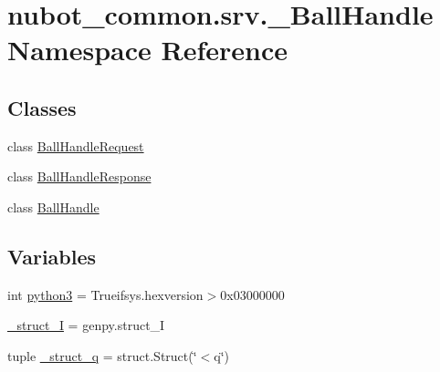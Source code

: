 \hypertarget{namespacenubot__common_1_1srv_1_1__BallHandle}{\section{nubot\-\_\-common.\-srv.\-\_\-\-Ball\-Handle Namespace Reference}
\label{namespacenubot__common_1_1srv_1_1__BallHandle}
}
\subsection*{Classes}
\begin{DoxyCompactItemize}
\item 
class \hyperlink{classnubot__common_1_1srv_1_1__BallHandle_1_1BallHandleRequest}{Ball\-Handle\-Request}
\item 
class \hyperlink{classnubot__common_1_1srv_1_1__BallHandle_1_1BallHandleResponse}{Ball\-Handle\-Response}
\item 
class \hyperlink{classnubot__common_1_1srv_1_1__BallHandle_1_1BallHandle}{Ball\-Handle}
\end{DoxyCompactItemize}
\subsection*{Variables}
\begin{DoxyCompactItemize}
\item 
int \hyperlink{namespacenubot__common_1_1srv_1_1__BallHandle_a5b43d243eb270a053a02014aebbe0b57}{python3} = Trueifsys.\-hexversion$>$0x03000000
\item 
\hyperlink{namespacenubot__common_1_1srv_1_1__BallHandle_ab2af3865598445d74f9f6f9dd829fbab}{\-\_\-struct\-\_\-\-I} = genpy.\-struct\-\_\-\-I
\item 
tuple \hyperlink{namespacenubot__common_1_1srv_1_1__BallHandle_a0a6e3fbd722e66ea563734cefc28ef12}{\-\_\-struct\-\_\-q} = struct.\-Struct(\char`\"{}$<$q\char`\"{})
\end{DoxyCompactItemize}


